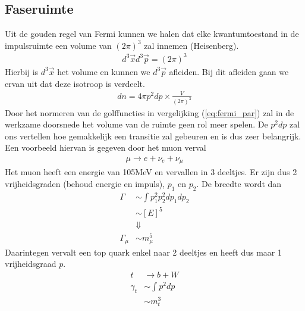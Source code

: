 \documentclass[../main.tex]{subfiles}
\begin{document}
\subsection{Faseruimte}%
\label{sub:faseruimte}

Uit de gouden regel van Fermi kunnen we halen dat elke kwantumtoestand in de impulsruimte een volume van $(2\pi)^3$ zal innemen (Heisenberg).
\begin{equation}
    \begin{aligned}
        \label{eq:fermi_faseruimte}
        d^3\vec{x}d^3\vec{p} = (2\pi)^3
    \end{aligned}
\end{equation}
Hierbij is $d^3\vec{x}$ het volume en kunnen we $d^3\vec{p}$ afleiden. Bij dit afleiden gaan we ervan uit dat deze isotroop is verdeelt.
\begin{equation}
    \begin{aligned}
        \label{eq:fermi_aantal_deeltjes}
        dn=4\pi p^2dp\times \frac{V}{(2\pi)^3} 
    \end{aligned}
\end{equation}
Door het normeren van de golffuncties in vergelijking (\ref{eq:fermi_par}) zal in de werkzame doorsnede het volume van de ruimte geen rol meer spelen. De $p^2dp$ zal ons vertellen hoe gemakkelijk een transitie zal gebeuren en is dus zeer belangrijk. Een voorbeeld hiervan is gegeven door het muon verval
\begin{equation}
    \begin{aligned}
        \label{eq:muon_verval}
        \mu \rightarrow e+\nu_e + \nu_\mu
    \end{aligned}
\end{equation}
Het muon heeft een energie van 105MeV en vervallen in 3 deeltjes. Er zijn dus 2 vrijheidsgraden (behoud energie en impuls), $p_1$ en $p_2$. De breedte wordt dan
\begin{equation}
    \begin{aligned}
        \label{eq:breedte_muon}
        \Gamma &\sim \int p_1^2 p_2^2 dp_1 dp_2\\
               &\sim [E]^5\\
               &\Downarrow\\
        \Gamma_\mu &\sim m_\mu^5
    \end{aligned}
\end{equation}
Daarintegen vervalt een top quark enkel naar 2 deeltjes en heeft dus maar 1 vrijheidsgraad $p$.
\begin{equation}
    \begin{aligned}
        \label{eq:top_verval}
        t&\rightarrow b+W\\
        \gamma_t &\sim \int p^2dp\\
                 &\sim m_t^3
    \end{aligned}
\end{equation}
\end{document}
